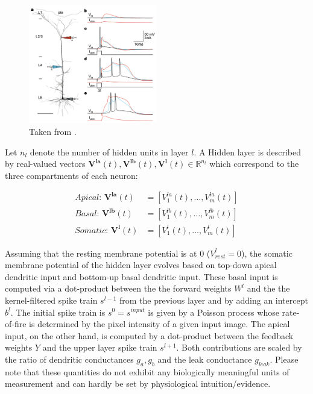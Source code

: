 \documentclass[colorinlistoftodos]{article}
\theoremstyle{definition}
\begin{document}
\begin{figure}
\centering
\includegraphics[width=0.5\textwidth]{../figures/report/pyramidal_plateu}
\caption{\label{fig:pyramidal} Taken from \citet{larkum_1999}. }
\end{figure}
 
Let $n_{l}$ denote the number of hidden units in layer $l$. A Hidden layer is described by real-valued vectors $\mathbf{V^{la}}(t), \mathbf{V^{lb}}(t), \mathbf{V^{l}}(t) \in \mathbb{R}^{n_l}$ which correspond to the three compartments of each neuron:

\begin{align*}
	\textit{Apical:  } \mathbf{V^{la}}(t) &= [V_1^{la}(t), \dots, V_m^{la}(t)]\\
	\textit{Basal:  } \mathbf{V^{lb}}(t) &= [V_1^{lb}(t), \dots, V_m^{lb}(t)]\\
	\textit{Somatic:  }\mathbf{V^{l}}(t) &= [V_1^{l}(t), \dots, V_m^{l}(t)]
\end{align*}

Assuming that the resting membrane potential is at 0 ($V^l_{rest}=0$), the somatic membrane potential of the hidden layer evolves based on top-down apical dendritic input and bottom-up basal dendritic input. 
These basal input is computed via a dot-product between the the forward weights $W^l$ and the the kernel-filtered spike train $s^{l-1}$ from the previous layer and by adding an intercept $b^l$. The initial spike train is $s^0 = s^{input}$ is given by a Poisson process whose rate-of-fire is determined by the pixel intensity of a given input image. 
The apical input, on the other hand, is computed by a dot-product between the feedback weights $Y$ and the upper layer spike train $s^{l+1}$. Both contributions are scaled by the ratio of dendritic conductances $g_a, g_b$ and the leak conductance $g_{leak}$. Please note that these quantities do not exhibit any biologically meaningful units of measurement and can hardly be set by physiological intuition/evidence.
\end{document}
